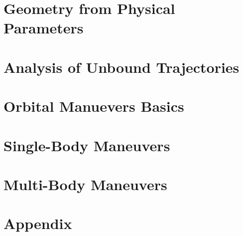 \documentclass{article}
\begin{document}
\pagebreak
\section{Geometry from Physical Parameters}\label{sec:Geometry from Physical Parameters}


\pagebreak
\section{Analysis of Unbound Trajectories}\label{sec:Special Trajectories}


\pagebreak
\section{Orbital Manuevers Basics}\label{sec:Manuevers Basics}


\pagebreak
\section{Single-Body Maneuvers}\label{sec:Manuevers}


\pagebreak
\section{Multi-Body Maneuvers}\label{sec:Advanced Manuevers}


\pagebreak
\section{Appendix}\label{sec:Appendix}

\end{document}
